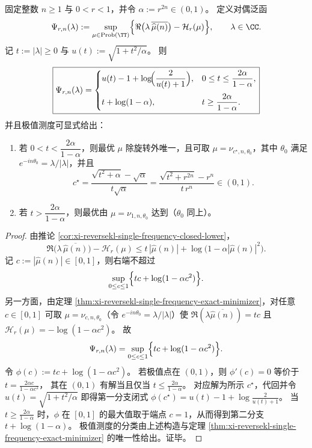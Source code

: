 \begin{theorem}\label{thm:xi-reversekl-single-frequency-legendre-fenchel-closed}
固定整数 \(n\ge 1\) 与 \(0<r<1\)，并令 \(\alpha:=r^{2n}\in(0,1)\)。
定义对偶泛函
\[
\Psi_{r,n}(\lambda)
:=\sup_{\mu\in\mathrm{Prob}(\TT)}
\Bigl\{\Re\bigl(\lambda\,\overline{\widehat\mu(n)}\bigr)-\mathcal H_r(\mu)\Bigr\},
\qquad \lambda\in\CC.
\]
记 \(t:=|\lambda|\ge 0\) 与 \(u(t):=\sqrt{1+t^2/\alpha}\)。
则
\[
\boxed{
\Psi_{r,n}(\lambda)=
\begin{cases}
u(t)-1+\log\!\Bigl(\dfrac{2}{u(t)+1}\Bigr),& 0\le t\le \dfrac{2\alpha}{1-\alpha},\\[1.1em]
t+\log(1-\alpha),& t\ge \dfrac{2\alpha}{1-\alpha}.
\end{cases}}
\]
并且极值测度可显式给出：
\begin{enumerate}
  \item 若 \(0<t<\dfrac{2\alpha}{1-\alpha}\)，则最优 \(\mu\) 除旋转外唯一，且可取 \(\mu=\nu_{c^\star,n,\theta_0}\)，其中 \(\theta_0\) 满足 \(e^{-in\theta_0}=\lambda/|\lambda|\)，并且
  \[
  c^\star
  =\frac{\sqrt{t^2+\alpha}-\sqrt{\alpha}}{t\sqrt{\alpha}}
  =\frac{\sqrt{t^2+r^{2n}}-r^{n}}{t\,r^{n}}
  \in(0,1).
  \]
  \item 若 \(t>\dfrac{2\alpha}{1-\alpha}\)，则最优由 \(\mu=\nu_{1,n,\theta_0}\) 达到（\(\theta_0\) 同上）。
\end{enumerate}
\end{theorem}

\begin{proof}
由推论 \ref{cor:xi-reversekl-single-frequency-closed-lower}，
\[
\Re\bigl(\lambda\,\overline{\widehat\mu(n)}\bigr)-\mathcal H_r(\mu)
\le t\,|\widehat\mu(n)|+\log\bigl(1-\alpha|\widehat\mu(n)|^2\bigr).
\]
记 \(c:=|\widehat\mu(n)|\in[0,1]\)，则右端不超过
\[
\sup_{0\le c\le 1}\Bigl\{t c+\log(1-\alpha c^2)\Bigr\}.
\]
另一方面，由定理 \ref{thm:xi-reversekl-single-frequency-exact-minimizer}，对任意 \(c\in[0,1]\) 可取 \(\mu=\nu_{c,n,\theta_0}\)（令 \(e^{-in\theta_0}=\lambda/|\lambda|\)）使
\(
\Re(\lambda\overline{\widehat\mu(n)})=t c
\)
且
\(
\mathcal H_r(\mu)=-\log(1-\alpha c^2)
\)。
故
\[
\Psi_{r,n}(\lambda)=\sup_{0\le c\le 1}\Bigl\{t c+\log(1-\alpha c^2)\Bigr\}.
\]
令 \(\phi(c):=t c+\log(1-\alpha c^2)\)。
若极值点在 \((0,1)\)，则 \(\phi'(c)=0\) 等价于
\(
t=\frac{2\alpha c}{1-\alpha c^2}
\)，
其在 \((0,1)\) 有解当且仅当 \(t\le \frac{2\alpha}{1-\alpha}\)。
对应解为所示 \(c^\star\)，代回并令 \(u(t)=\sqrt{1+t^2/\alpha}\) 即得第一分支闭式
\(
\phi(c^\star)=u(t)-1+\log\frac{2}{u(t)+1}
\)。
当 \(t\ge \frac{2\alpha}{1-\alpha}\) 时，\(\phi\) 在 \([0,1]\) 的最大值取于端点 \(c=1\)，从而得到第二分支 \(t+\log(1-\alpha)\)。
极值测度的分类由上述构造与定理 \ref{thm:xi-reversekl-single-frequency-exact-minimizer} 的唯一性给出。证毕。
\end{proof}

